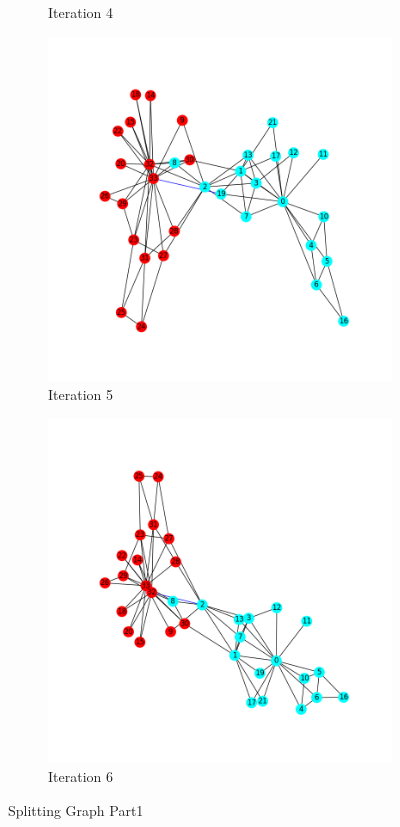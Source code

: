 \documentclass[11pt]{article} %
\begin{document}
\begin{figure}[h!]
\begin{subfigure}[b]{0.4\linewidth}
    \caption{Iteration 4}
  \end{subfigure}
  \begin{subfigure}[b]{0.4\linewidth}
    \includegraphics[width=\linewidth]{../Figures/Iteration5.png}
    \caption{Iteration 5}
  \end{subfigure}
  \begin{subfigure}[b]{0.4\linewidth}
    \includegraphics[width=\linewidth]{../Figures/Iteration6.png}
    \caption{Iteration 6}
  \end{subfigure}
  \caption{Splitting Graph Part1}
  \label{../Figures/Iteration1.png}
\end{figure}
\clearpage %
\end{document}

